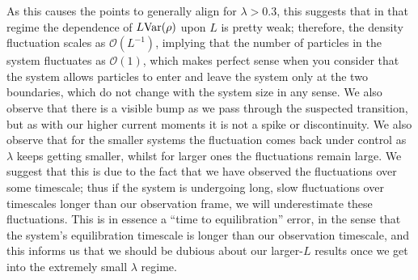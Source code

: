 As this causes the points to generally align for $\lambda>0.3$, this suggests that in that regime the 
dependence of $L \mathrm{Var} (\rho)$ upon $L$ is pretty weak; therefore,
the density fluctuation scales as $\mathcal{O}(L^{-1})$, implying that the number of particles in the
system fluctuates as $\mathcal{O}(1)$, which makes perfect sense when you consider that the system
allows particles to enter and leave the system only at the two boundaries, which do not change with the
system size in any sense. We also observe that there is a visible bump as we pass through the suspected
transition, but as with our higher current moments it is not a spike or discontinuity. We also
observe that for the smaller systems the fluctuation comes back under control as $\lambda$ keeps getting
smaller, whilst for larger ones the fluctuations remain large. We suggest that this is due to the fact
that we have observed the fluctuations over some timescale; thus if the system is undergoing long, slow
fluctuations over timescales longer than our observation frame, we will underestimate these fluctuations.
This is in essence a ``time to equilibration'' error, in the sense that the system's equilibration
timescale is longer than our observation timescale, and this informs us that we should be dubious about
our larger-$L$ results once we get into the extremely small $\lambda$ regime.

